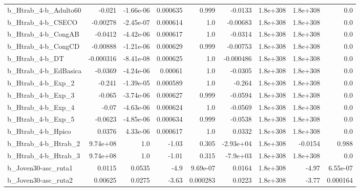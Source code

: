 \begin{tabular}{lrrrrrrrr}
b\_Htrab\_4-b\_Adulto60         &      -0.021 &    -1.66e-06 &  0.000635 &    0.999 &    -0.0133 &    1.8e+308 &     1.8e+308 &           0.0 \\
b\_Htrab\_4-b\_CSECO            &    -0.00278 &    -2.45e-07 &  0.000614 &      1.0 &   -0.00683 &    1.8e+308 &     1.8e+308 &           0.0 \\
b\_Htrab\_4-b\_CongAB           &     -0.0412 &    -4.42e-06 &  0.000617 &      1.0 &    -0.0314 &    1.8e+308 &     1.8e+308 &           0.0 \\
b\_Htrab\_4-b\_CongCD           &    -0.00888 &    -1.21e-06 &  0.000629 &    0.999 &   -0.00753 &    1.8e+308 &     1.8e+308 &           0.0 \\
b\_Htrab\_4-b\_DT               &   -0.000316 &    -8.41e-08 &  0.000625 &      1.0 &  -0.000486 &    1.8e+308 &     1.8e+308 &           0.0 \\
b\_Htrab\_4-b\_EdBasica         &     -0.0369 &    -4.24e-06 &   0.00061 &      1.0 &    -0.0305 &    1.8e+308 &     1.8e+308 &           0.0 \\
b\_Htrab\_4-b\_Exp\_2            &      -0.241 &    -1.39e-05 &  0.000589 &      1.0 &     -0.264 &    1.8e+308 &     1.8e+308 &           0.0 \\
b\_Htrab\_4-b\_Exp\_3            &      -0.065 &    -3.74e-06 &  0.000627 &    0.999 &    -0.0594 &    1.8e+308 &     1.8e+308 &           0.0 \\
b\_Htrab\_4-b\_Exp\_4            &       -0.07 &    -4.63e-06 &  0.000624 &      1.0 &    -0.0569 &    1.8e+308 &     1.8e+308 &           0.0 \\
b\_Htrab\_4-b\_Exp\_5            &     -0.0623 &    -4.85e-06 &  0.000634 &    0.999 &    -0.0538 &    1.8e+308 &     1.8e+308 &           0.0 \\
b\_Htrab\_4-b\_Hpico            &      0.0376 &     4.33e-06 &  0.000617 &      1.0 &     0.0332 &    1.8e+308 &     1.8e+308 &           0.0 \\
b\_Htrab\_4-b\_Htrab\_2          &    9.74e+08 &          1.0 &     -1.03 &    0.305 &  -2.93e+04 &    1.8e+308 &      -0.0154 &         0.988 \\
b\_Htrab\_4-b\_Htrab\_3          &    9.74e+08 &          1.0 &     -1.01 &    0.315 &   -7.9e+03 &    1.8e+308 &     1.8e+308 &           0.0 \\
b\_Joven30-asc\_ruta1          &      0.0115 &       0.0535 &      -4.9 & 9.69e-07 &     0.0164 &    1.8e+308 &        -4.97 &      6.55e-07 \\
b\_Joven30-asc\_ruta2          &     0.00625 &       0.0275 &     -3.63 & 0.000283 &     0.0223 &    1.8e+308 &        -3.77 &      0.000164 \\

\end{tabular}
